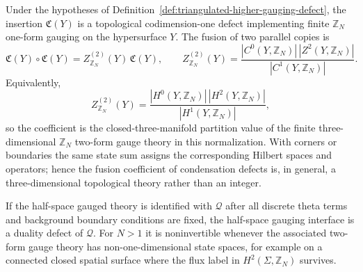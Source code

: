 \begin{theorem}
\label{thm:finite-higher-gauging-condensation-defects}
Under the hypotheses of
Definition~\ref{def:triangulated-higher-gauging-defect}, the insertion
\(\mathfrak C(Y)\) is a topological codimension-one defect implementing
finite \(\mathbb Z_N\) one-form gauging on the hypersurface \(Y\).  The
fusion of two parallel copies is
\begin{equation}
  \mathfrak C(Y)\circ\mathfrak C(Y)
  =
  Z^{(2)}_{\mathbb Z_N}(Y)\,\mathfrak C(Y),
  \qquad
  Z^{(2)}_{\mathbb Z_N}(Y)
  =
  \frac{|C^0(Y,\mathbb Z_N)|\,|Z^2(Y,\mathbb Z_N)|}
       {|C^1(Y,\mathbb Z_N)|}.
  \label{eq:finite-higher-gauging-fusion}
\end{equation}
Equivalently,
\begin{equation}
  Z^{(2)}_{\mathbb Z_N}(Y)
  =
  \frac{|H^0(Y,\mathbb Z_N)|\,|H^2(Y,\mathbb Z_N)|}
       {|H^1(Y,\mathbb Z_N)|},
  \label{eq:finite-higher-gauging-topological-factor}
\end{equation}
so the coefficient is the closed-three-manifold partition value of the
finite three-dimensional \(\mathbb Z_N\) two-form gauge theory in this
normalization.  With corners or boundaries the same state sum assigns the
corresponding Hilbert spaces and operators; hence the fusion coefficient of
condensation defects is, in general, a three-dimensional topological theory
rather than an integer.

If the half-space gauged theory is identified with \(\mathcal Q\) after all
discrete theta terms and background boundary conditions are fixed, the
half-space gauging interface is a duality defect of \(\mathcal Q\).  For
\(N>1\) it is noninvertible whenever the associated two-form gauge theory has
non-one-dimensional state spaces, for example on a connected closed spatial
surface where the flux label in \(H^2(\Sigma,\mathbb Z_N)\) survives.
\end{theorem}

